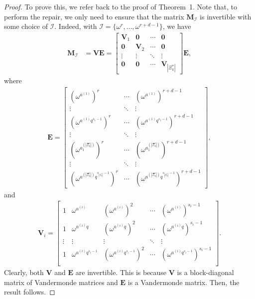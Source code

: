 \documentclass[10pt,a4paper]{amsart}
\newcommand{\cI}{\mathcal{I}}
\begin{document}
\begin{proof}
    To prove this, we refer back to the proof of Theorem~1. Note that, to perform the repair, we only need to ensure that the matrix $\boldsymbol{M}_\cI$ is invertible with some choice of $\cI$. Indeed, with $\cI = \{\omega^r,\ldots,\omega^{r+d-1}\}$, we have
    \begin{align*}
    \boldsymbol{M}_\cI&= \boldsymbol{VE} = \begin{bmatrix}
        \boldsymbol{V}_1 &\boldsymbol{0} & \cdots & \boldsymbol{0}\\
        \boldsymbol{0} & \boldsymbol{V}_2 & \cdots & \boldsymbol{0}\\
        \vdots & \vdots & \ddots & \vdots\\
        \boldsymbol{0} & \boldsymbol{0} & \cdots & \boldsymbol{V}_{|\Xi_k^*|}
    \end{bmatrix}\boldsymbol{E},
    \end{align*}
    where
    \begin{align*}
    \boldsymbol{E} = \begin{bmatrix}
        \left(\omega^{a^{(1)}}\right)^r & \cdots & \left(\omega^{a^{(1)}}\right)^{r+d-1}\\
        \vdots & \ddots & \vdots \\
        \left(\omega^{a^{(1)}q^{s_1-1}}\right)^r & \cdots & \left(\omega^{a^{(1)}q^{s_1-1}}\right)^{r+d-1}\\
        \vdots & \ddots & \vdots\\
        \left(\omega^{a_{1}^{(|\Xi_k^*|)}}\right)^r & \cdots & \left(\omega^{a_{1}^{(|\Xi_k^*|)}}\right)^{r+d-1}\\
        \vdots & \ddots & \vdots \\
        \left(\omega^{a^{(|\Xi_k^*|)}q^{s_{|\Xi_k^*|}-1}}\right)^r & \cdots & \left(\omega^{a^{(|\Xi_k^*|)}q^{s_{|\Xi_k^*|}-1}}\right)^{r+d-1}
    \end{bmatrix},
    \end{align*}
    and
    \begin{align*}
        \boldsymbol{V}_i = \begin{bmatrix}
            1 & \omega^{a^{(i)}} & \left(\omega^{a^{(i)}}\right)^2 & \cdots & \left(\omega^{a^{(i)}}\right)^{s_i-1}\\
            1 & \omega^{a^{(i)}q} & \left(\omega^{a^{(i)}q}\right)^2 & \cdots & \left(\omega^{a^{(i)}q}\right)^{s_i-1}\\
            \vdots & \vdots & \vdots & \ddots & \vdots\\
            1 & \omega^{a^{(i)}q^{s_i-1}} & \left(\omega^{a^{(i)}q^{s_i-1}}\right)^2 & \cdots & \left(\omega^{a^{(i)}q^{s_i-1}}\right)^{s_i-1}\\
        \end{bmatrix}. 
    \end{align*}
    Clearly, both $\boldsymbol{V}$ and $\boldsymbol{E}$ are invertible. This is because $\boldsymbol{V}$ is a block-diagonal matrix of Vandermonde matrices and $\boldsymbol{E}$ is a Vandermonde matrix. Then, the result follows. 
\end{proof}
\end{document}
